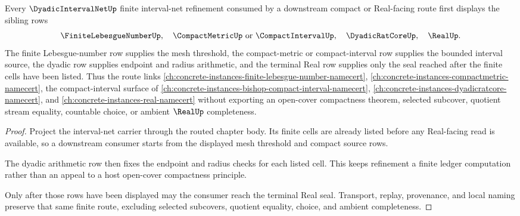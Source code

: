 \begin{theorem}
\label{thm:dyadic-interval-net-finite-net-sibling-dependency-route}
Every $\DyadicIntervalNetUp$ finite interval-net refinement consumed by a downstream compact or Real-facing route first displays the sibling rows
$$
\FiniteLebesgueNumberUp,\quad
\CompactMetricUp\ \text{or}\ \CompactIntervalUp,\quad
\DyadicRatCoreUp,\quad
\RealUp .
$$
The finite Lebesgue-number row supplies the mesh threshold, the compact-metric or compact-interval row supplies the bounded interval source, the dyadic row supplies endpoint and radius arithmetic, and the terminal Real row supplies only the seal reached after the finite cells have been listed. Thus the route links \autoref{ch:concrete-instances-finite-lebesgue-number-namecert}, \autoref{ch:concrete-instances-compactmetric-namecert}, the compact-interval surface of \autoref{ch:concrete-instances-bishop-compact-interval-namecert}, \autoref{ch:concrete-instances-dyadicratcore-namecert}, and \autoref{ch:concrete-instances-real-namecert} without exporting an open-cover compactness theorem, selected subcover, quotient stream equality, countable choice, or ambient $\RealUp$ completeness.
\end{theorem}
\begin{proof}
Project the interval-net carrier through the routed chapter body. Its finite cells are already listed before any Real-facing read is available, so a downstream consumer starts from the displayed mesh threshold and compact source rows.

The dyadic arithmetic row then fixes the endpoint and radius checks for each listed cell. This keeps refinement a finite ledger computation rather than an appeal to a host open-cover compactness principle.

Only after those rows have been displayed may the consumer reach the terminal Real seal. Transport, replay, provenance, and local naming preserve that same finite route, excluding selected subcovers, quotient equality, choice, and ambient completeness.
\end{proof}
